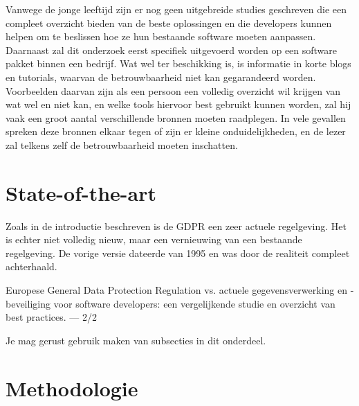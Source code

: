Vanwege de jonge leeftijd zijn er nog geen uitgebreide studies geschreven die een compleet overzicht bieden van de beste oplossingen en die developers kunnen helpen om te beslissen hoe ze hun bestaande software moeten aanpassen. Daarnaast zal dit onderzoek eerst specifiek uitgevoerd worden op een software pakket binnen een bedrijf.  
Wat wel ter beschikking is, is informatie in  korte blogs en tutorials, waarvan de betrouwbaarheid niet kan gegarandeerd worden. Voorbeelden daarvan zijn als een persoon een volledig overzicht wil krijgen van wat wel en niet kan, en welke tools hiervoor best gebruikt kunnen worden, zal hij vaak een groot aantal verschillende bronnen moeten raadplegen. In vele gevallen spreken deze bronnen elkaar tegen of zijn er kleine onduidelijkheden, en de lezer zal telkens zelf de betrouwbaarheid moeten inschatten. 



\section{State-of-the-art}
\label{sec:state-of-the-art}

Zoals in de introductie beschreven is de GDPR een zeer actuele regelgeving. Het is echter niet volledig nieuw, maar een vernieuwing van een bestaande regelgeving. De vorige versie dateerde van 1995 en was  door de realiteit compleet achterhaald. 

Europese General Data Protection Regulation vs. actuele gegevensverwerking en -beveiliging voor software developers: een vergelijkende studie en overzicht van best practices. — 2/2 




Je mag gerust gebruik maken van subsecties in dit onderdeel.

\section{Methodologie}
\label{sec:methodologie}

